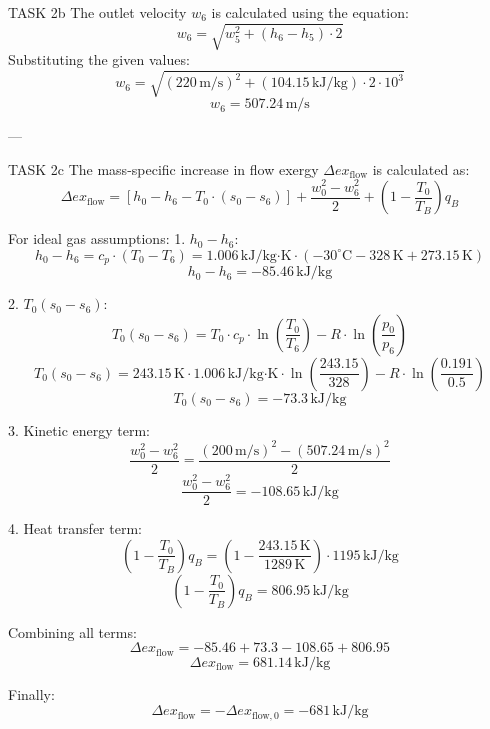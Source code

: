 TASK 2b  
The outlet velocity \( w_6 \) is calculated using the equation:  
\[
w_6 = \sqrt{w_5^2 + (h_6 - h_5) \cdot 2}
\]  
Substituting the given values:  
\[
w_6 = \sqrt{(220 \, \text{m/s})^2 + (104.15 \, \text{kJ/kg}) \cdot 2 \cdot 10^3}
\]  
\[
w_6 = 507.24 \, \text{m/s}
\]  

---

TASK 2c  
The mass-specific increase in flow exergy \( \Delta ex_{\text{flow}} \) is calculated as:  
\[
\Delta ex_{\text{flow}} = [h_0 - h_6 - T_0 \cdot (s_0 - s_6)] + \frac{w_0^2 - w_6^2}{2} + \left(1 - \frac{T_0}{T_B}\right) q_B
\]  

For ideal gas assumptions:  
1. \( h_0 - h_6 \):  
\[
h_0 - h_6 = c_p \cdot (T_0 - T_6) = 1.006 \, \text{kJ/kg·K} \cdot (-30^\circ\text{C} - 328 \, \text{K} + 273.15 \, \text{K})
\]  
\[
h_0 - h_6 = -85.46 \, \text{kJ/kg}
\]  

2. \( T_0 (s_0 - s_6) \):  
\[
T_0 (s_0 - s_6) = T_0 \cdot c_p \cdot \ln\left(\frac{T_0}{T_6}\right) - R \cdot \ln\left(\frac{p_0}{p_6}\right)
\]  
\[
T_0 (s_0 - s_6) = 243.15 \, \text{K} \cdot 1.006 \, \text{kJ/kg·K} \cdot \ln\left(\frac{243.15}{328}\right) - R \cdot \ln\left(\frac{0.191}{0.5}\right)
\]  
\[
T_0 (s_0 - s_6) = -73.3 \, \text{kJ/kg}
\]  

3. Kinetic energy term:  
\[
\frac{w_0^2 - w_6^2}{2} = \frac{(200 \, \text{m/s})^2 - (507.24 \, \text{m/s})^2}{2}
\]  
\[
\frac{w_0^2 - w_6^2}{2} = -108.65 \, \text{kJ/kg}
\]  

4. Heat transfer term:  
\[
\left(1 - \frac{T_0}{T_B}\right) q_B = \left(1 - \frac{243.15 \, \text{K}}{1289 \, \text{K}}\right) \cdot 1195 \, \text{kJ/kg}
\]  
\[
\left(1 - \frac{T_0}{T_B}\right) q_B = 806.95 \, \text{kJ/kg}
\]  

Combining all terms:  
\[
\Delta ex_{\text{flow}} = -85.46 + 73.3 - 108.65 + 806.95
\]  
\[
\Delta ex_{\text{flow}} = 681.14 \, \text{kJ/kg}
\]  

Finally:  
\[
\Delta ex_{\text{flow}} = -\Delta ex_{\text{flow},0} = -681 \, \text{kJ/kg}
\]  